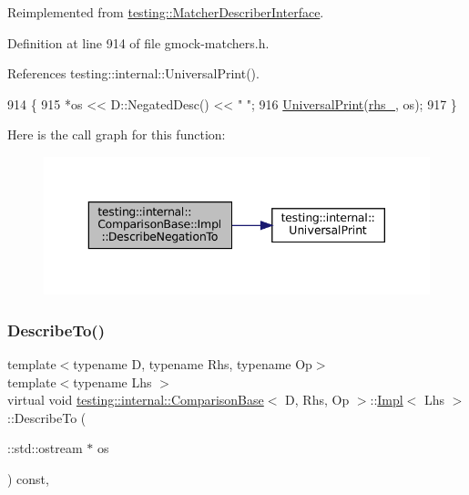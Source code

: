 Reimplemented from \hyperlink{classtesting_1_1MatcherDescriberInterface_a2071afbc47097c4d1c0064275af34db0}{testing\+::\+Matcher\+Describer\+Interface}.



Definition at line 914 of file gmock-\/matchers.\+h.



References testing\+::internal\+::\+Universal\+Print().


\begin{DoxyCode}
914                                                           \{
915       *os << D::NegatedDesc() <<  \textcolor{stringliteral}{" "};
916       \hyperlink{namespacetesting_1_1internal_a30708fa2bacf11895b03bdb21eb72309}{UniversalPrint}(\hyperlink{classtesting_1_1internal_1_1ComparisonBase_1_1Impl_aa665caf1136e3a09f8019296ccbdea44}{rhs\_}, os);
917     \}
\end{DoxyCode}
Here is the call graph for this function\+:
\nopagebreak
\begin{figure}[H]
\begin{center}
\leavevmode
\includegraphics[width=343pt]{classtesting_1_1internal_1_1ComparisonBase_1_1Impl_ab4a33d42d0941bc94e3b0051ce76bb72_cgraph}
\end{center}
\end{figure}
\mbox{\label{classtesting_1_1internal_1_1ComparisonBase_1_1Impl_a224bdd8f8196208d8138668dc74e1d27}} 
\subsubsection{\texorpdfstring{Describe\+To()}{DescribeTo()}}
{\footnotesize\ttfamily template$<$typename D, typename Rhs, typename Op$>$ \\
template$<$typename Lhs $>$ \\
virtual void \hyperlink{classtesting_1_1internal_1_1ComparisonBase}{testing\+::internal\+::\+Comparison\+Base}$<$ D, Rhs, Op $>$\+::\hyperlink{classtesting_1_1internal_1_1ComparisonBase_1_1Impl}{Impl}$<$ Lhs $>$\+::Describe\+To (\begin{DoxyParamCaption}\item[{\+::std\+::ostream $\ast$}]{os }\end{DoxyParamCaption}) const\hspace{0.3cm}{\ttfamily [inline]}, {\ttfamily [virtual]}}



